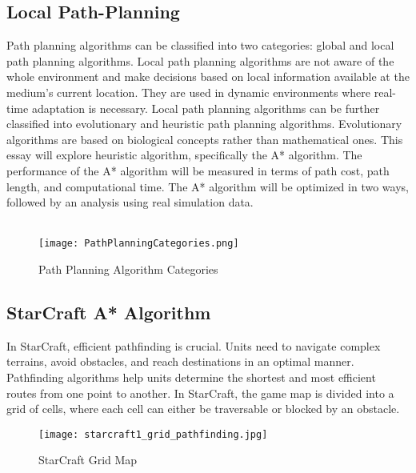 \documentclass[12pt]{article}
\begin{document}
\subsection{Local Path-Planning}
Path planning algorithms can be classified into two categories: global and local path planning algorithms. Local path planning algorithms are not aware of the whole environment and make decisions based on local information available at the medium's current location. They are used in dynamic environments where real-time adaptation is necessary. Local path planning algorithms can be further classified into evolutionary and heuristic path planning algorithms. Evolutionary algorithms are based on biological concepts rather than mathematical ones. This essay will explore heuristic algorithm, specifically the A* algorithm. The performance of the A* algorithm will be measured in terms of path cost, path length, and computational time. The A* algorithm will be optimized in two ways, followed by an analysis using real simulation data.
\\\\
\begin{figure}[h] 
    \centering
    \texttt{[image: PathPlanningCategories.png]} %
    \caption{Path Planning Algorithm Categories}
    \label{fig:example}
\end{figure}
\newpage
\subsection{StarCraft A* Algorithm}
In StarCraft, efficient pathfinding is crucial. Units need to navigate complex terrains, avoid obstacles, and reach destinations in an optimal manner. Pathfinding algorithms help units determine the shortest and most efficient routes from one point to another. In StarCraft, the game map is divided into a grid of cells, where each cell can either be traversable or blocked by an obstacle. 

\begin{figure}[h] 
    \centering
    \texttt{[image: starcraft1\_grid\_pathfinding.jpg]} %
    \caption{StarCraft Grid Map}
    \label{fig:example}
\end{figure}
\end{document}
